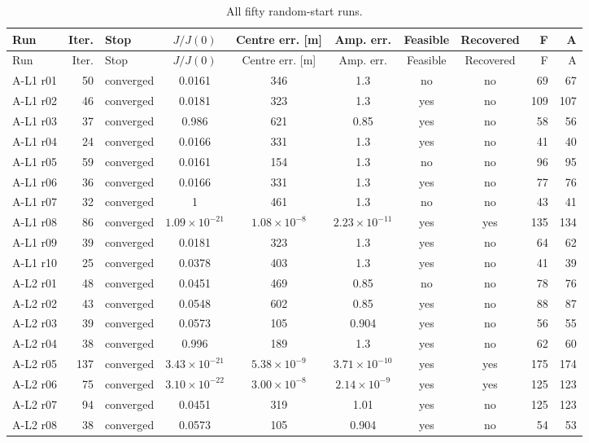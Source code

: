 {\scriptsize
\begin{longtable}{lrlcccccrr}
\caption{All fifty random-start runs.}\label{tab:table_all_runs} \\
\toprule
Run & Iter. & Stop & $J/J(0)$ & Centre err. [m] & Amp. err. & Feasible & Recovered & F & A \\
\midrule
\endfirsthead
\toprule
Run & Iter. & Stop & $J/J(0)$ & Centre err. [m] & Amp. err. & Feasible & Recovered & F & A \\
\midrule
\endhead
\bottomrule
\endfoot
A-L1 r01 & 50 & converged & 0.0161 & 346 & 1.3 & no & no & 69 & 67 \\
A-L1 r02 & 46 & converged & 0.0181 & 323 & 1.3 & yes & no & 109 & 107 \\
A-L1 r03 & 37 & converged & 0.986 & 621 & 0.85 & yes & no & 58 & 56 \\
A-L1 r04 & 24 & converged & 0.0166 & 331 & 1.3 & yes & no & 41 & 40 \\
A-L1 r05 & 59 & converged & 0.0161 & 154 & 1.3 & no & no & 96 & 95 \\
A-L1 r06 & 36 & converged & 0.0166 & 331 & 1.3 & yes & no & 77 & 76 \\
A-L1 r07 & 32 & converged & 1 & 461 & 1.3 & no & no & 43 & 41 \\
A-L1 r08 & 86 & converged & $1.09\times 10^{-21}$ & $1.08\times 10^{-8}$ & $2.23\times 10^{-11}$ & yes & yes & 135 & 134 \\
A-L1 r09 & 39 & converged & 0.0181 & 323 & 1.3 & yes & no & 64 & 62 \\
A-L1 r10 & 25 & converged & 0.0378 & 403 & 1.3 & yes & no & 41 & 39 \\
A-L2 r01 & 48 & converged & 0.0451 & 469 & 0.85 & no & no & 78 & 76 \\
A-L2 r02 & 43 & converged & 0.0548 & 602 & 0.85 & yes & no & 88 & 87 \\
A-L2 r03 & 39 & converged & 0.0573 & 105 & 0.904 & yes & no & 56 & 55 \\
A-L2 r04 & 38 & converged & 0.996 & 189 & 1.3 & yes & no & 62 & 60 \\
A-L2 r05 & 137 & converged & $3.43\times 10^{-21}$ & $5.38\times 10^{-9}$ & $3.71\times 10^{-10}$ & yes & yes & 175 & 174 \\
A-L2 r06 & 75 & converged & $3.10\times 10^{-22}$ & $3.00\times 10^{-8}$ & $2.14\times 10^{-9}$ & yes & yes & 125 & 123 \\
A-L2 r07 & 94 & converged & 0.0451 & 319 & 1.01 & yes & no & 125 & 123 \\
A-L2 r08 & 38 & converged & 0.0573 & 105 & 0.904 & yes & no & 54 & 53 \\

\end{longtable}}
